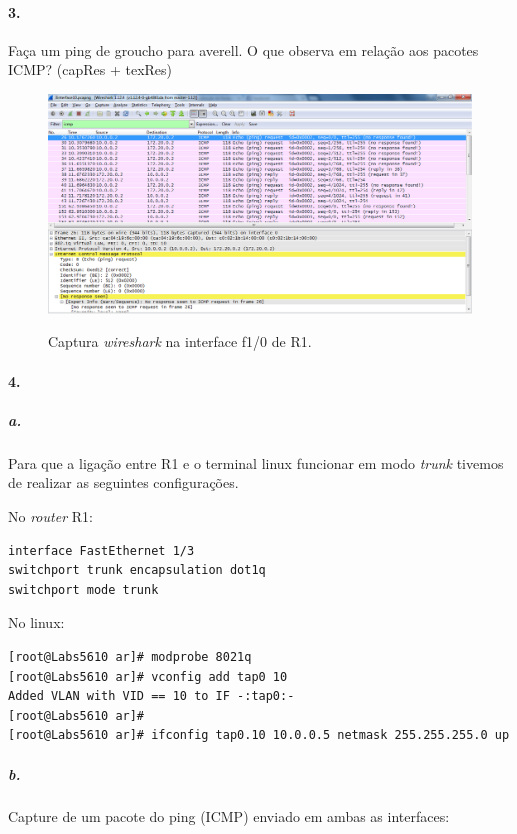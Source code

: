 \paragraph{3.}
 Faça um ping de groucho para averell. O que observa em relação aos pacotes ICMP? (capRes + texRes)
 
\begin{figure}[h]
\centering
\includegraphics[width=1\textwidth, height=0.33\textheight]{3_interface10_R1.png}
\label{fig:2-capturaWireshark}
\caption{Captura \emph{wireshark} na interface \textsf{f1/0} de \textsf{R1}.}
\end{figure}


\paragraph{4.}

\subparagraph{a.}
Para que a ligação entre \textsf{R1} e o terminal \textsf{linux} funcionar em modo \emph{trunk} tivemos de realizar as seguintes configurações.

No \emph{router} \textsf{R1}:
\begin{verbatim}
interface FastEthernet 1/3
switchport trunk encapsulation dot1q
switchport mode trunk
\end{verbatim}

No \textsf{linux}:
\begin{verbatim}
[root@Labs5610 ar]# modprobe 8021q
[root@Labs5610 ar]# vconfig add tap0 10
Added VLAN with VID == 10 to IF -:tap0:-
[root@Labs5610 ar]# 
[root@Labs5610 ar]# ifconfig tap0.10 10.0.0.5 netmask 255.255.255.0 up
\end{verbatim}


\subparagraph{b.}
Capture de um pacote do ping (ICMP) enviado em ambas as interfaces:

